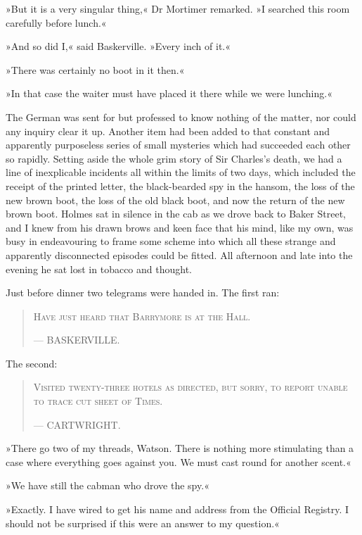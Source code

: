 »But it is a very singular thing,« Dr Mortimer remarked. »I searched this room carefully before lunch.«

»And so did I,« said Baskerville. »Every inch of it.«

»There was certainly no boot in it then.«

»In that case the waiter must have placed it there while we were lunching.«

The German was sent for but professed to know nothing of the matter, nor could any inquiry clear it up. Another item had been added to that constant and apparently purposeless series of small mysteries which had succeeded each other so rapidly. Setting aside the whole grim story of Sir Charles's death, we had a line of inexplicable incidents all within the limits of two days, which included the receipt of the printed letter, the black-bearded spy in the hansom, the loss of the new brown boot, the loss of the old black boot, and now the return of the new brown boot. Holmes sat in silence in the cab as we drove back to Baker Street, and I knew from his drawn brows and keen face that his mind, like my own, was busy in endeavouring to frame some scheme into which all these strange and apparently disconnected episodes could be fitted. All afternoon and late into the evening he sat lost in tobacco and thought.

Just before dinner two telegrams were handed in. The first ran:
\begin{samepage}
\blockquote{
\textsc{Have just heard that Barrymore is at the Hall.}
\begin{flushright}
— {\small\scshape BASKERVILLE.}
\end{flushright} 
}
\end{samepage}

The second:
\begin{samepage}
\blockquote{
\textsc{Visited twenty-three hotels as directed, but sorry, to report unable to trace cut sheet of Times.}
\begin{flushright}
— {\small\scshape CARTWRIGHT.}
\end{flushright}
}
\end{samepage}

»There go two of my threads, Watson. There is nothing more stimulating than a case where everything goes against you. We must cast round for another scent.«

»We have still the cabman who drove the spy.«

»Exactly. I have wired to get his name and address from the Official Registry. I should not be surprised if this were an answer to my question.«

